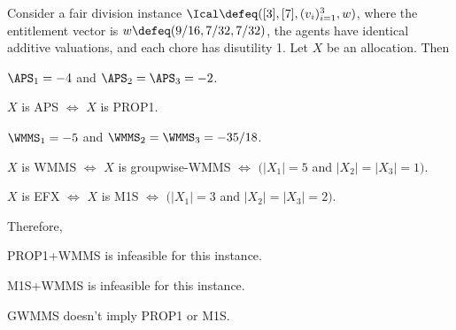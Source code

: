\begin{lemma}
\label{cex:gwmms-nimpl-prop1-m1s-ue-chores}
Consider a fair division instance $\Ical \defeq ([3], [7], (v_i)_{i=1}^3, w)$,
where the entitlement vector is $w \defeq (9/16, 7/32, 7/32)$,
the agents have identical additive valuations, and each chore has disutility 1.
Let $X$ be an allocation. Then
\begin{tightenum}
\item $\APS_1 = -4$ and $\APS_2 = \APS_3 = -2$.
\item $X$ is APS $\iff$ $X$ is PROP1.
\item $\WMMS_1 = -5$ and $\WMMS_2 = \WMMS_3 = -35/18$.
\item $X$ is WMMS $\iff$ $X$ is groupwise-WMMS $\iff$ $(|X_1| = 5$ and $|X_2| = |X_3| = 1)$.
\item $X$ is EFX $\iff$ $X$ is M1S $\iff$ $(|X_1| = 3$ and $|X_2| = |X_3| = 2)$.
\end{tightenum}
Therefore,
\begin{tightenum}
\item PROP1+WMMS is infeasible for this instance.
\item M1S+WMMS is infeasible for this instance.
\item GWMMS doesn't imply PROP1 or M1S.
\end{tightenum}
\end{lemma}

